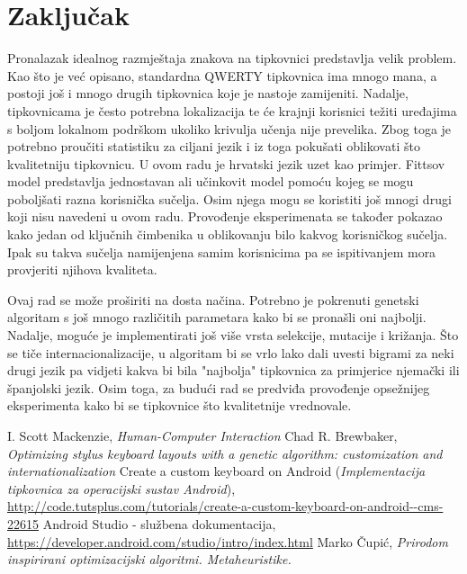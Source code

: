\documentclass[times, utf8, zavrsni, numeric]{fer}
\begin{document}
\chapter{Zaključak}
Pronalazak idealnog razmještaja znakova na tipkovnici predstavlja velik problem. Kao što je već opisano, standardna QWERTY tipkovnica ima mnogo mana, a postoji još i mnogo drugih tipkovnica koje je nastoje zamijeniti. Nadalje, tipkovnicama je često potrebna lokalizacija te će krajnji korisnici težiti uređajima s boljom lokalnom podrškom ukoliko krivulja učenja  nije prevelika. Zbog toga je potrebno proučiti statistiku za ciljani jezik i iz toga pokušati oblikovati što kvalitetniju tipkovnicu. U ovom radu je hrvatski jezik uzet kao primjer. Fittsov model predstavlja jednostavan ali učinkovit model pomoću kojeg se mogu poboljšati razna korisnička sučelja. Osim njega mogu se koristiti još mnogi drugi koji nisu navedeni u ovom radu. Provođenje eksperimenata se također pokazao kako jedan od ključnih čimbenika u oblikovanju bilo kakvog korisničkog sučelja. Ipak su takva sučelja namijenjena samim korisnicima pa se ispitivanjem mora provjeriti njihova kvaliteta.

Ovaj rad se može proširiti na dosta načina. Potrebno je pokrenuti genetski algoritam s još mnogo različitih parametara kako bi se pronašli oni najbolji. Nadalje, moguće je implementirati još više vrsta selekcije, mutacije i križanja. Što se tiče internacionalizacije, u algoritam bi se vrlo lako dali uvesti bigrami za neki drugi jezik pa vidjeti kakva bi bila "najbolja" tipkovnica za primjerice njemački ili španjolski jezik. Osim toga, za budući rad se predviđa provođenje opsežnijeg eksperimenta kako bi se tipkovnice što kvalitetnije vrednovale.

\begin{thebibliography}{9}
I. Scott Mackenzie, \emph{Human-Computer Interaction}
Chad R. Brewbaker, \emph{Optimizing stylus keyboard layouts with a genetic algorithm: customization and internationalization}
Create a custom keyboard on Android (\emph{Implementacija tipkovnica za operacijski sustav Android}), \url{http://code.tutsplus.com/tutorials/create-a-custom-keyboard-on-android--cms-22615}
Android Studio - službena dokumentacija, \url{https://developer.android.com/studio/intro/index.html}
Marko Čupić, \emph{Prirodom inspirirani optimizacijski algoritmi. Metaheuristike.}
\end{thebibliography}
\end{document}
